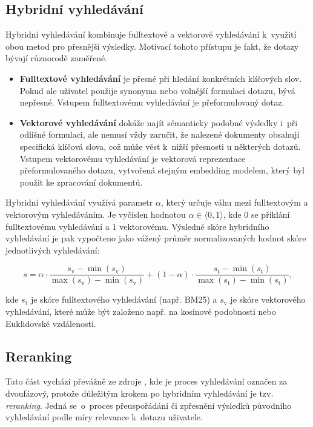 \subsection{Hybridní vyhledávání}
\label{hybrid}
Hybridní vyhledávání kombinuje fulltextové a vektorové vyhledávání k~využití obou metod pro přesnější výsledky. Motivací tohoto přístupu je fakt, že dotazy bývají různorodě zaměřené. 
\begin{itemize}
    \item \textbf{Fulltextové vyhledávání} je přesné při hledání konkrétních klíčových slov. Pokud ale uživatel použije synonyma nebo volnější formulaci dotazu, bývá nepřesné. Vstupem fulltextovému vyhledávání je přeformulovaný dotaz.
    \item \textbf{Vektorové vyhledávání} dokáže najít sémanticky podobné výsledky i~při odlišné formulaci, ale nemusí vždy zaručit, že nalezené dokumenty obsahují specifická klíčová slova, což může vést k~nižší přesnosti u některých dotazů. Vstupem vektorovému vyhledávání je vektorová reprezentace přeformulovaného dotazu, vytvořená stejným embedding modelem, který byl použit ke zpracování dokumentů.
\end{itemize}
Hybridní vyhledávání využívá parametr $\alpha$, který určuje váhu mezi fulltextovým a vektorovým vyhledáváním. Je vyčíslen hodnotou $\alpha \in \langle 0, 1 \rangle$, kde $0$ se přiklání fulltextovému vyhledávání a $1$ vektorovému. 
Výsledné skóre hybridního vyhledávání je pak vypočteno jako vážený průměr normalizovaných hodnot skóre jednotlivých vyhledávání:

\begin{equation}
    s = \alpha \cdot \frac{s_{\text{v}} - \min(s_{\text{v}})}{\max(s_{\text{v}}) - \min(s_{\text{v}})} + (1 - \alpha) \cdot \frac{s_{\text{t}} - \min(s_{\text{t}})}{\max(s_{\text{t}}) - \min(s_{\text{t}})},
\end{equation}

\noindent kde $s_{\text{t}}$ je skóre fulltextového vyhledávání (např. BM25) a $s_{\text{v}}$ je skóre vektorového vyhledávání, které může být založeno např. na kosinové podobnosti nebo Euklidovské vzdálenosti.

\subsection{Reranking}
Tato část vychází převážně ze zdroje \cite{reranking}, kde je proces vyhledávání označen za dvoufázový, protože důležitým krokem po hybridním vyhledávání je tzv. \textit{reranking}. Jedná se~o~proces přeuspořádání či zpřesnění výsledků původního vyhledávání podle míry relevance k~dotazu uživatele.

